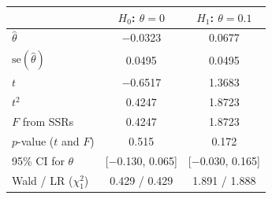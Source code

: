 \begin{tabular}{lcc}
\toprule
 & $H_0$: $\theta=0$ & $H_1$: $\theta=0.1$ \\
\midrule
$\hat\theta$ & $-$0.0323 & 0.0677 \\
$\mathrm{se}(\hat\theta)$ & 0.0495 & 0.0495 \\
$t$ & $-$0.6517 & 1.3683 \\
$t^2$ & 0.4247 & 1.8723 \\
$F$ from SSRs & 0.4247 & 1.8723 \\
$p$-value ($t$ and $F$) & 0.515 & 0.172 \\
95\% CI for $\theta$ & [$-$0.130, 0.065] & [$-$0.030, 0.165] \\
Wald / LR ($\chi^2_1$) & 0.429 / 0.429 & 1.891 / 1.888 \\
\bottomrule
\end{tabular}
